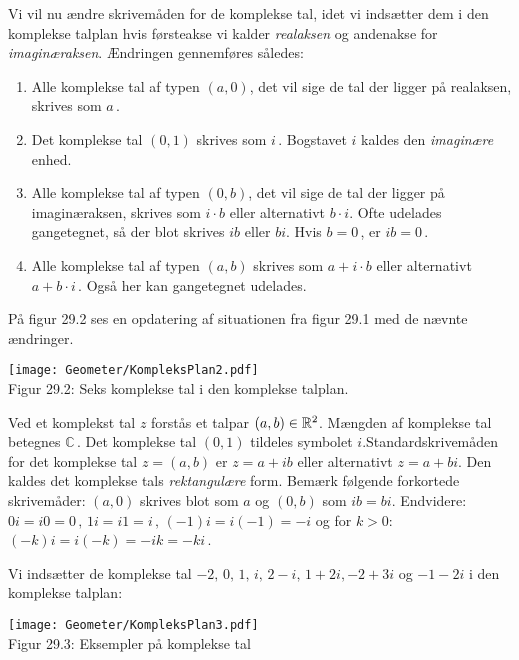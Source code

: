Vi vil nu ændre skrivemåden for de komplekse tal, idet vi indsætter dem i den komplekse talplan hvis førsteakse vi kalder \textit{realaksen} og andenakse for \textit{imaginæraksen}. Ændringen gennemføres således:
\begin{enumerate}
\item
Alle komplekse tal af typen $(a,0)$, det vil sige de tal der ligger på realaksen, skrives som $a\,$. 
\item
Det komplekse tal $(0,1)$ skrives som $i\,$. Bogstavet $i$ kaldes den \textit{imaginære} enhed.
\item
Alle komplekse tal af typen $(0,b)$, det vil sige de tal der ligger på imaginæraksen, skrives som $i\cdot b$ eller alternativt $b\cdot i$. Ofte udelades gangetegnet, så der blot skrives $ib$ eller $bi$. Hvis $b=0\,$, er $ib=0\,$. 
\item
Alle komplekse tal af typen $(a,b)$ skrives som $a+i\cdot b$ eller alternativt $a+b\cdot i\,$. Også her kan gangetegnet udelades.
\end{enumerate}
På figur 29.2 ses en opdatering af situationen fra figur 29.1 med de nævnte ændringer.

\begin{center}
	\texttt{[image: Geometer/KompleksPlan2.pdf]}\\
Figur 29.2: Seks komplekse tal i den komplekse talplan.		
\end{center}

\begin{definition}
Ved et komplekst tal $z$ forstås et talpar $(a,b)\in \mathbb{R}^2$. Mængden af komplekse tal betegnes $\mathbb C\,.$\bs
Det komplekse tal $(0,1)$ tildeles symbolet $i$.\bs Standardskrivemåden for det komplekse tal $z=(a,b)$ er 
 $z=a+ib$ eller alternativt $z=a+bi$. Den kaldes det komplekse tals \textit{rektangulære} form.\bs
Bemærk følgende forkortede skrivemåder: $(a,0)$ skrives blot som $a$ og $(0,b)$ som $ib=bi$. Endvidere: $0i=i0=0\,,\,1i=i1=i\,,\,(-1)i=i(-1)=-i$ og for $k>0:$ $(-k)i=i(-k)=-ik=-ki\,$.
\end{definition}


\begin{example}
Vi indsætter de komplekse tal $-2,\,0,\,1,\,i,\,2-i,\,1+2i,-2+3i$ og $-1-2i$ i den komplekse talplan:
\begin{center}
	\texttt{[image: Geometer/KompleksPlan3.pdf]}\\
Figur 29.3: Eksempler på komplekse tal 
\end{center}
\end{example}

